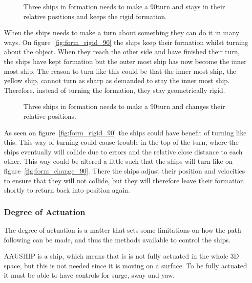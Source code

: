 \begin{figure}[htbp]
	\centering
	
	\caption{Three ships in formation needs to make a 90\textdegree turn and stays in their relative positions and keeps the rigid formation.}
	\label{fig:form_rigid_90}
\end{figure}

When the ships needs to make a turn about something they can do it in many ways. On figure~\vref{fig:form_rigid_90} the ships keep their formation whilst turning about the object. When they reach the other side and have finished their turn, the ships have kept formation but the outer most ship has now become the inner most ship. The reason to turn like this could be that the inner most ship, the yellow ship, cannot turn as sharp as demanded to stay the inner most ship. Therefore, instead of turning the formation, they stay geometrically rigid.

\begin{figure}[htbp]
	\centering
	
	\caption{Three ships in formation needs to make a 90\textdegree turn and changes their relative positions.}
	\label{fig:form_change_90}
\end{figure}

As seen on figure~\vref{fig:form_rigid_90} the ships could have benefit of turning like this. This way of turning could cause trouble in the top of the turn, where the ships eventually will collide due to errors and the relative close distance to each other. This way could be altered a little such that the ships will turn like on figure~\vref{fig:form_change_90}. There the ships adjust their position and velocities to ensure that they will not collide, but they will therefore leave their formation shortly to return back into position again.

\subsubsection{Degree of Actuation}
The degree of actuation is a matter that sets some limitations on how
the path following can be made, and thus the methods available to
control the ships.

AAUSHIP is a ship, which means that is is not fully actuated in the
whole 3D space, but this is not needed since it is moving on a
surface. To be fully actuated it must be able to have controls for
surge, sway and yaw.

